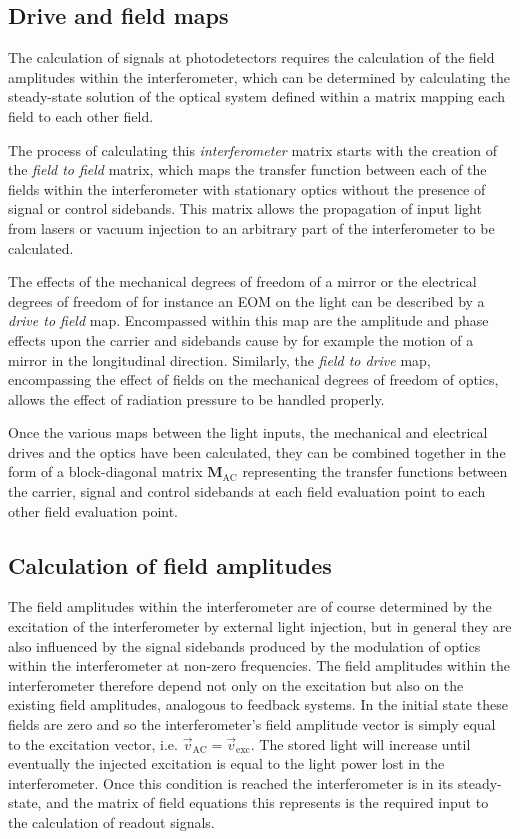 \subsection{Drive and field maps}
The calculation of signals at photodetectors requires the calculation of the field amplitudes within the interferometer, which can be determined by calculating the steady-state solution of the optical system defined within a matrix mapping each field to each other field.

The process of calculating this \emph{interferometer} matrix starts with the creation of the \emph{field to field} matrix, which maps the transfer function between each of the fields within the interferometer with stationary optics without the presence of signal or control sidebands. This matrix allows the propagation of input light from lasers or vacuum injection to an arbitrary part of the interferometer to be calculated.

The effects of the mechanical degrees of freedom of a mirror or the electrical degrees of freedom of for instance an \gls{EOM} on the light can be described by a \emph{drive to field} map. Encompassed within this map are the amplitude and phase effects upon the carrier and sidebands cause by for example the motion of a mirror in the longitudinal direction. Similarly, the \emph{field to drive} map, encompassing the effect of fields on the mechanical degrees of freedom of optics, allows the effect of radiation pressure to be handled properly.

Once the various maps between the light inputs, the mechanical and electrical drives and the optics have been calculated, they can be combined together in the form of a block-diagonal matrix $\mathbf{M}_{\text{AC}}$ representing the transfer functions between the carrier, signal and control sidebands at each field evaluation point to each other field evaluation point.

\subsection{Calculation of field amplitudes}
The field amplitudes within the interferometer are of course determined by the excitation of the interferometer by external light injection, but in general they are also influenced by the signal sidebands produced by the modulation of optics within the interferometer at non-zero frequencies. The field amplitudes within the interferometer therefore depend not only on the excitation but also on the existing field amplitudes, analogous to feedback systems. In the initial state these fields are zero and so the interferometer's field amplitude vector is simply equal to the excitation vector, i.e. $\vec{v}_{\text{AC}} = \vec{v}_{\text{exc}}$. The stored light will increase until eventually the injected excitation is equal to the light power lost in the interferometer. Once this condition is reached the interferometer is in its steady-state, and the matrix of field equations this represents is the required input to the calculation of readout signals.

